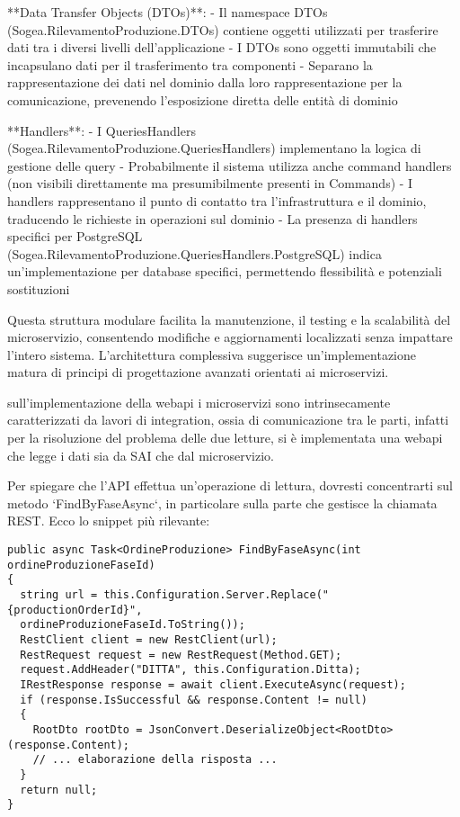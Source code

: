 **Data Transfer Objects (DTOs)**:
- Il namespace DTOs (Sogea.RilevamentoProduzione.DTOs) contiene oggetti utilizzati per trasferire dati tra i diversi livelli dell'applicazione
- I DTOs sono oggetti immutabili che incapsulano dati per il trasferimento tra componenti
- Separano la rappresentazione dei dati nel dominio dalla loro rappresentazione per la comunicazione, prevenendo l'esposizione diretta delle entità di dominio

**Handlers**:
- I QueriesHandlers (Sogea.RilevamentoProduzione.QueriesHandlers) implementano la logica di gestione delle query
- Probabilmente il sistema utilizza anche command handlers (non visibili direttamente ma presumibilmente presenti in Commands)
- I handlers rappresentano il punto di contatto tra l'infrastruttura e il dominio, traducendo le richieste in operazioni sul dominio
- La presenza di handlers specifici per PostgreSQL (Sogea.RilevamentoProduzione.QueriesHandlers.PostgreSQL) indica un'implementazione per database specifici, permettendo flessibilità e potenziali sostituzioni

Questa struttura modulare facilita la manutenzione, il testing e la scalabilità del microservizio, consentendo modifiche e aggiornamenti localizzati senza impattare l'intero sistema. L'architettura complessiva suggerisce un'implementazione matura di principi di progettazione avanzati orientati ai microservizi.

sull'implementazione della webapi
i microservizi sono intrinsecamente caratterizzati da lavori di integration, ossia di comunicazione tra le parti, infatti per la risoluzione del problema delle due letture, si è implementata una webapi che legge i dati sia da SAI che dal microservizio. 

Per spiegare che l'API effettua un'operazione di lettura, dovresti concentrarti sul metodo `FindByFaseAsync`, in particolare sulla parte che gestisce la chiamata REST. Ecco lo snippet più rilevante:

\begin{verbatim}
public async Task<OrdineProduzione> FindByFaseAsync(int ordineProduzioneFaseId)
{
  string url = this.Configuration.Server.Replace("{productionOrderId}", 
  ordineProduzioneFaseId.ToString());
  RestClient client = new RestClient(url);
  RestRequest request = new RestRequest(Method.GET);
  request.AddHeader("DITTA", this.Configuration.Ditta);
  IRestResponse response = await client.ExecuteAsync(request);
  if (response.IsSuccessful && response.Content != null)
  {
    RootDto rootDto = JsonConvert.DeserializeObject<RootDto>(response.Content);
    // ... elaborazione della risposta ...
  }
  return null;
}
\end{verbatim}

